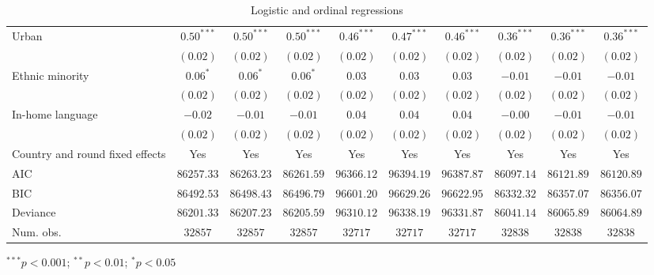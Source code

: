 \begin{table}
\begin{center}
\begin{threeparttable}
\begin{tabular}{l c c c c c c c c c}
Urban                           & $0.50^{***}$  & $0.50^{***}$  & $0.50^{***}$  & $0.46^{***}$  & $0.47^{***}$  & $0.46^{***}$  & $0.36^{***}$  & $0.36^{***}$  & $0.36^{***}$  \\
                                & $(0.02)$      & $(0.02)$      & $(0.02)$      & $(0.02)$      & $(0.02)$      & $(0.02)$      & $(0.02)$      & $(0.02)$      & $(0.02)$      \\
Ethnic minority                 & $0.06^{*}$    & $0.06^{*}$    & $0.06^{*}$    & $0.03$        & $0.03$        & $0.03$        & $-0.01$       & $-0.01$       & $-0.01$       \\
                                & $(0.02)$      & $(0.02)$      & $(0.02)$      & $(0.02)$      & $(0.02)$      & $(0.02)$      & $(0.02)$      & $(0.02)$      & $(0.02)$      \\
In-home language                & $-0.02$       & $-0.01$       & $-0.01$       & $0.04$        & $0.04$        & $0.04$        & $-0.00$       & $-0.01$       & $-0.01$       \\
                                & $(0.02)$      & $(0.02)$      & $(0.02)$      & $(0.02)$      & $(0.02)$      & $(0.02)$      & $(0.02)$      & $(0.02)$      & $(0.02)$      \\
\midrule
Country and round fixed effects & Yes           & Yes           & Yes           & Yes           & Yes           & Yes           & Yes           & Yes           & Yes           \\
AIC                             & $86257.33$    & $86263.23$    & $86261.59$    & $96366.12$    & $96394.19$    & $96387.87$    & $86097.14$    & $86121.89$    & $86120.89$    \\
BIC                             & $86492.53$    & $86498.43$    & $86496.79$    & $96601.20$    & $96629.26$    & $96622.95$    & $86332.32$    & $86357.07$    & $86356.07$    \\
Deviance                        & $86201.33$    & $86207.23$    & $86205.59$    & $96310.12$    & $96338.19$    & $96331.87$    & $86041.14$    & $86065.89$    & $86064.89$    \\
Num. obs.                       & $32857$       & $32857$       & $32857$       & $32717$       & $32717$       & $32717$       & $32838$       & $32838$       & $32838$       \\
\bottomrule
\end{tabular}
\begin{tablenotes}[flushleft]
\scriptsize{\item $^{***}p<0.001$; $^{**}p<0.01$; $^{*}p<0.05$}
\end{tablenotes}
\end{threeparttable}
\caption{Logistic and ordinal regressions}
\label{table:coefficients}
\end{center}
\end{table}
